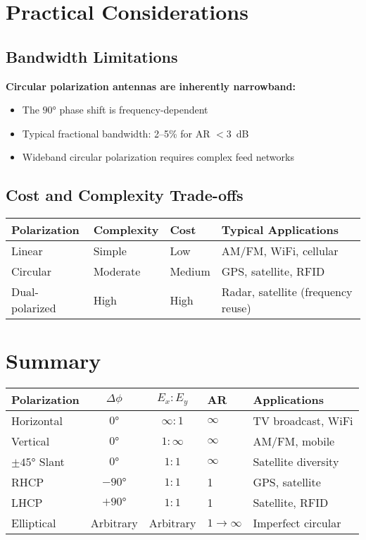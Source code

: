 \section{Practical Considerations}

\subsection{Bandwidth Limitations}

\textbf{Circular polarization antennas are inherently narrowband:}
\begin{itemize}
\item The $90°$ phase shift is frequency-dependent
\item Typical fractional bandwidth: 2--5\% for AR $< 3$~dB
\item Wideband circular polarization requires complex feed networks
\end{itemize}

\subsection{Cost and Complexity Trade-offs}

\begin{center}
\begin{tabular}{@{}llll@{}}
\toprule
\textbf{Polarization} & \textbf{Complexity} & \textbf{Cost} & \textbf{Typical Applications} \\
\midrule
Linear & Simple & Low & AM/FM, WiFi, cellular \\
Circular & Moderate & Medium & GPS, satellite, RFID \\
Dual-polarized & High & High & Radar, satellite (frequency reuse) \\
\bottomrule
\end{tabular}
\end{center}

\section{Summary}

\begin{center}
\begin{tabular}{@{}lccll@{}}
\toprule
\textbf{Polarization} & \textbf{$\Delta\phi$} & \textbf{$E_x : E_y$} & \textbf{AR} & \textbf{Applications} \\
\midrule
Horizontal & $0°$ & $\infty : 1$ & $\infty$ & TV broadcast, WiFi \\
Vertical & $0°$ & $1 : \infty$ & $\infty$ & AM/FM, mobile \\
$\pm 45°$ Slant & $0°$ & $1 : 1$ & $\infty$ & Satellite diversity \\
RHCP & $-90°$ & $1 : 1$ & 1 & GPS, satellite \\
LHCP & $+90°$ & $1 : 1$ & 1 & Satellite, RFID \\
Elliptical & Arbitrary & Arbitrary & $1 \to \infty$ & Imperfect circular \\
\bottomrule
\end{tabular}
\end{center}

